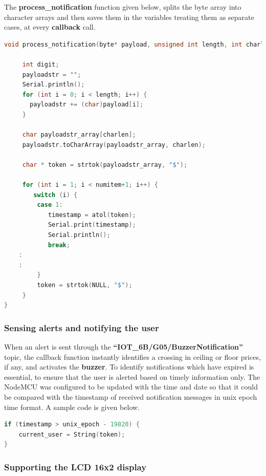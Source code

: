 \vspace{\baselineskip}
The \textbf{process\_notification} function given below, splits the byte array into character arrays and then saves them in the variables treating them as separate cases, at every \textbf{callback} call.\\

\begin{lstlisting}[language=C++]
void process_notification(byte* payload, unsigned int length, int charlen, int numitem) {

     int digit;
     payloadstr = "";
     Serial.println();
     for (int i = 0; i < length; i++) {
       payloadstr += (char)payload[i];
     }

     char payloadstr_array[charlen];
     payloadstr.toCharArray(payloadstr_array, charlen);

     char * token = strtok(payloadstr_array, "$");
   
     for (int i = 1; i < numitem+1; i++) {
        switch (i) {
         case 1:
            timestamp = atol(token);
            Serial.print(timestamp);
            Serial.println();
            break;
	:
	:
         }
         token = strtok(NULL, "$");
     }
}
\end{lstlisting}

\subsubsection{Sensing alerts and notifying the user}

When an alert is sent through the \textbf{“IOT\_6B/G05/BuzzerNotification”} topic, the callback function instantly identifies a crossing in ceiling or floor prices, if any, and activates the \textbf{buzzer}. 
To identify notifications which have expired is essential, to ensure that the user is alerted based on timely information only. The NodeMCU was configured to be updated with the time and date so that it could be compared with the timestamp of received notification messages in unix epoch time format. A sample code is given below.\\

\begin{lstlisting}[language=C++]
if (timestamp > unix_epoch - 19820) {
    current_user = String(token);
}
\end{lstlisting}

\subsubsection{Supporting the LCD 16x2 display}

